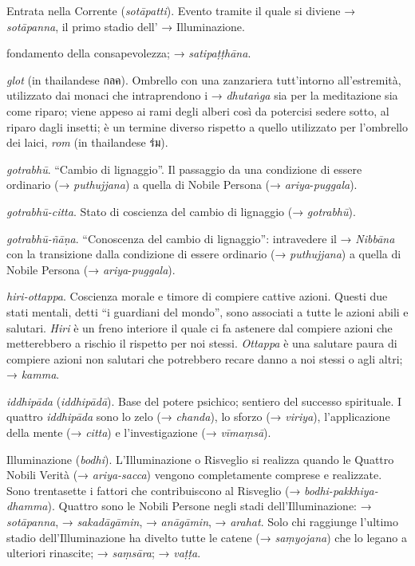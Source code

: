 Entrata nella Corrente (\emph{sotāpatti}). Evento tramite il quale si
diviene → \emph{sotāpanna}, il primo stadio dell' → Illuminazione.

fondamento della consapevolezza; → \emph{satipaṭṭhāna}.

\emph{glot} (in thailandese กลค). Ombrello con una zanzariera
tutt'intorno all'estremità, utilizzato dai monaci che intraprendono i →
\emph{dhutaṅga} sia per la meditazione sia come riparo; viene appeso ai
rami degli alberi così da potercisi sedere sotto, al riparo dagli
insetti; è un termine diverso rispetto a quello utilizzato per
l'ombrello dei laici, \emph{rom} (in thailandese ร่ม).

\emph{gotrabhū}. ``Cambio di lignaggio''. Il passaggio da una condizione
di essere ordinario (→ \emph{puthujjana}) a quella di Nobile Persona (→
\emph{ariya}-\emph{puggala}).

\emph{gotrabhū-citta}. Stato di coscienza del cambio di lignaggio (→
\emph{gotrabhū}).

\emph{gotrabhū-ñāṇa}. ``Conoscenza del cambio di lignaggio'':
intravedere il → \emph{Nibbāna} con la transizione dalla condizione di
essere ordinario (→ \emph{puthujjana}) a quella di Nobile Persona (→
\emph{ariya}-\emph{puggala}).

\emph{hiri-ottappa}. Coscienza morale e timore di compiere cattive
azioni. Questi due stati mentali, detti ``i guardiani del mondo'', sono
associati a tutte le azioni abili e salutari. \emph{Hiri} è un freno
interiore il quale ci fa astenere dal compiere azioni che metterebbero a
rischio il rispetto per noi stessi. \emph{Ottappa} è una salutare paura
di compiere azioni non salutari che potrebbero recare danno a noi stessi
o agli altri; → \emph{kamma}.

\emph{iddhipāda} (\emph{iddhipādā}). Base del potere psichico; sentiero
del successo spirituale. I quattro \emph{iddhipāda} sono lo zelo (→
\emph{chanda}), lo sforzo (→ \emph{viriya}), l'applicazione della mente
(→ \emph{citta}) e l'investigazione (→ \emph{vīmaṃsā}).

Illuminazione (\emph{bodhi}). L'Illuminazione o Risveglio si realizza
quando le Quattro Nobili Verità (→ \emph{ariya-sacca}) vengono
completamente comprese e realizzate. Sono trentasette i fattori che
contribuiscono al Risveglio (→ \emph{bodhi-pakkhiya-dhamma}). Quattro
sono le Nobili Persone negli stadi dell'Illuminazione: →
\emph{sotāpanna}, → \emph{sakadāgāmin}, → \emph{anāgāmin}, →
\emph{arahat}. Solo chi raggiunge l'ultimo stadio dell'Illuminazione ha
divelto tutte le catene (→ \emph{saṃyojana}) che lo legano a ulteriori
rinascite; → \emph{saṃsāra}; → \emph{vaṭṭa}.

